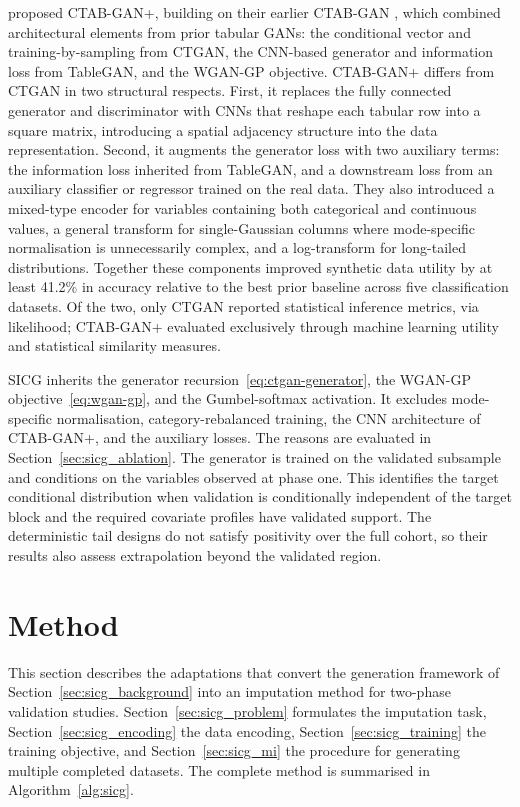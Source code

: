 \citet{zhao2022ctabganplus} proposed CTAB-GAN+, building on their earlier CTAB-GAN \citep{zhao2021ctabgan}, which combined architectural elements from prior tabular GANs: the conditional vector and training-by-sampling from CTGAN, the CNN-based generator and information loss from TableGAN, and the WGAN-GP objective. CTAB-GAN+ differs from CTGAN in two structural respects. First, it replaces the fully connected generator and discriminator with CNNs that reshape each tabular row into a square matrix, introducing a spatial adjacency structure into the data representation. Second, it augments the generator loss with two auxiliary terms: the information loss inherited from TableGAN, and a downstream loss from an auxiliary classifier or regressor trained on the real data. They also introduced a mixed-type encoder for variables containing both categorical and continuous values, a general transform for single-Gaussian columns where mode-specific normalisation is unnecessarily complex, and a log-transform for long-tailed distributions. Together these components improved synthetic data utility by at least 41.2\% in accuracy relative to the best prior baseline across five classification datasets. Of the two, only CTGAN reported statistical inference metrics, via likelihood; CTAB-GAN+ evaluated exclusively through machine learning utility and statistical similarity measures.

SICG inherits the generator recursion~\eqref{eq:ctgan-generator}, the WGAN-GP objective~\eqref{eq:wgan-gp}, and the Gumbel-softmax activation. It excludes mode-specific normalisation, category-rebalanced training, the CNN architecture of CTAB-GAN+, and the auxiliary losses. The reasons are evaluated in Section~\ref{sec:sicg_ablation}. The generator is trained on the validated subsample and conditions on the variables observed at phase one. This identifies the target conditional distribution when validation is conditionally independent of the target block and the required covariate profiles have validated support. The deterministic tail designs do not satisfy positivity over the full cohort, so their results also assess extrapolation beyond the validated region.


\section{Method}
\label{sec:sicg_method}

This section describes the adaptations that convert the generation framework of Section~\ref{sec:sicg_background} into an imputation method for two-phase validation studies. Section~\ref{sec:sicg_problem} formulates the imputation task, Section~\ref{sec:sicg_encoding} the data encoding, Section~\ref{sec:sicg_training} the training objective, and Section~\ref{sec:sicg_mi} the procedure for generating multiple completed datasets. The complete method is summarised in Algorithm~\ref{alg:sicg}.


